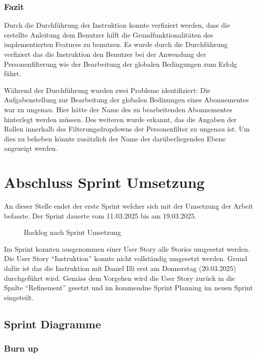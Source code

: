 \subsection{Fazit}
Durch die Durchführung der Instruktion konnte verfiziert werden, dass die erstellte Anleitung 
dem Benutzer hilft die Grundfunktionalitäten des implementierten Features zu benutzen. Es wurde durch die Durchführung verfiziert
das die Instruktion den Benutzer bei der Anwendung der Personenfilterung wie der Bearbeitung der globalen Bedingungen zum Erfolg führt.

Während der Durchführung wurden zwei Probleme identifiziert: Die Aufgabenstellung zur Bearbeitung der globalen Bedinungen eines Abonnementes war zu ungenau.
Hier hätte der Name des zu bearbeitenden Abonnementes hinterlegt werden müssen. Des weiteren wurde erkannt, das die Angaben der Rollen innerhalb des Filterungsdropdowns
der Personenfilter zu ungenau ist. Um dies zu beheben könnte zusätzlich der Name der darüberliegenden Ebene angezeigt werden.


\chapter{Abschluss Sprint Umsetzung}
An dieser Stelle endet der erste Sprint welcher sich mit der Umsetzung der
Arbeit befasste. Der Sprint dauerte vom 11.03.2025 bis am 19.03.2025.

\begin{figure}[h]
   \centering
   \caption{Backlog nach Sprint Umsetzung}
\end{figure}

Im Sprint konnten ausgenommen einer User Story alle Stories umgesetzt
werden. Die User Story ``Instruktion'' konnte nicht vollständig
umgesetzt werden. Grund dafür ist das die Instruktion mit Daniel Illi erst am Donnerstag (20.03.2025)
durchgeführt wird. Gemäss dem Vorgehen wird die User Story zurück in die Spalte ``Refinement'' gesetzt und im 
kommendne Sprint Planning im neuen Sprint eingeteilt.

\newpage

\section{Sprint Diagramme}

\subsection{Burn up}

